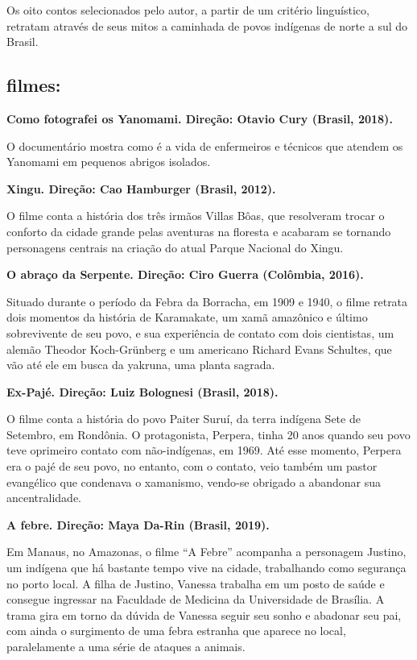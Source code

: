 \documentclass[12pt]{extarticle}
\begin{document}
Os oito contos selecionados pelo autor, a partir de um critério
linguístico, retratam através de seus mitos a caminhada de povos
indígenas de norte a sul do Brasil.

\subsection{filmes: }

\textbf{Como fotografei os Yanomami. Direção: Otavio Cury (Brasil,
2018).}

O documentário mostra como é a vida de enfermeiros e técnicos que
atendem os Yanomami em pequenos abrigos isolados.

\textbf{Xingu. Direção: Cao Hamburger (Brasil, 2012).}

O filme conta a história dos três irmãos Villas Bôas, que resolveram
trocar o conforto da cidade grande pelas aventuras na floresta e
acabaram se tornando personagens centrais na criação do atual Parque
Nacional do Xingu.

\textbf{O abraço da Serpente. Direção: Ciro Guerra (Colômbia, 2016).}

Situado durante o período da Febra da Borracha, em 1909 e 1940, o filme 
retrata dois momentos da história de Karamakate, um xamã amazônico e último 
sobrevivente de seu povo, e sua experiência de contato com dois cientistas, 
um alemão Theodor Koch-Grünberg e um americano Richard Evans Schultes, que 
vão até ele em busca da yakruna, uma planta sagrada. 

\textbf{Ex-Pajé. Direção: Luiz Bolognesi (Brasil, 2018).}

O filme conta a história do povo Paiter Suruí, da terra indígena Sete de 
Setembro, em Rondônia. O protagonista, Perpera, tinha 20 anos quando seu povo 
teve oprimeiro contato com não-indígenas, em 1969. Até esse momento, Perpera 
era o pajé de seu povo, no entanto, com o contato, veio também um pastor 
evangélico que condenava o xamanismo, vendo-se obrigado a abandonar sua ancentralidade.

\textbf{A febre. Direção: Maya Da-Rin (Brasil, 2019).}

Em Manaus, no Amazonas, o filme ``A Febre'' acompanha a personagem Justino, um
indígena que há bastante tempo vive na cidade, trabalhando como segurança no 
porto local. A filha de Justino, Vanessa trabalha em um posto de saúde e consegue 
ingressar na Faculdade de Medicina da Universidade de Brasília. 
A trama gira em torno da dúvida de Vanessa seguir seu sonho e abadonar seu pai, com 
ainda o surgimento de uma febra estranha que aparece no local, paralelamente a uma 
série de ataques a animais.
\end{document}
